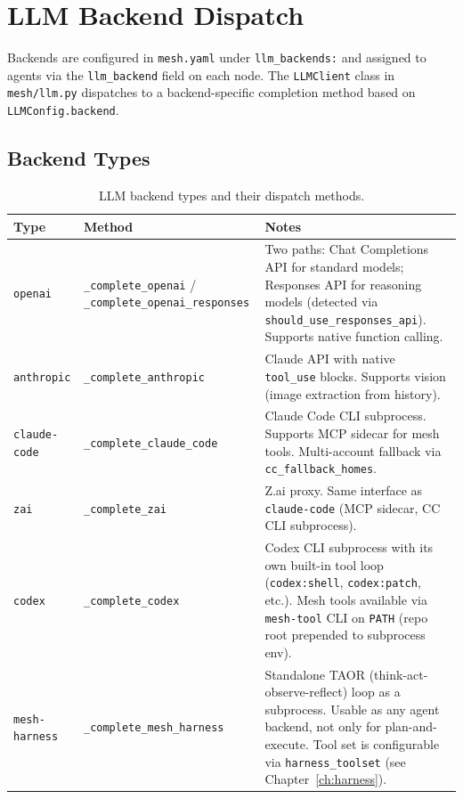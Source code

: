 \documentclass[11pt,letterpaper]{report}
\newcommand{\code}[1]{\texttt{#1}}
\begin{document}
\chapter{LLM Backend Dispatch}
\label{ch:backends}

Backends are configured in \code{mesh.yaml} under \code{llm\_backends:}
and assigned to agents via the \code{llm\_backend} field on each node.
The \code{LLMClient} class in \code{mesh/llm.py} dispatches to a
backend-specific completion method based on \code{LLMConfig.backend}.

\section{Backend Types}

\begin{table}[h]
\centering
\small
\begin{tabular}{@{}llL{6.5cm}@{}}
\toprule
\textbf{Type} & \textbf{Method} & \textbf{Notes} \\
\midrule
\code{openai}
  & \code{\_complete\_openai} /
    \code{\_complete\_openai\_responses}
  & Two paths: Chat Completions API for standard models;
    Responses API for reasoning models (detected via
    \code{should\_use\_responses\_api}). Supports native
    function calling. \\
\addlinespace
\code{anthropic}
  & \code{\_complete\_anthropic}
  & Claude API with native \code{tool\_use} blocks. Supports
    vision (image extraction from history). \\
\addlinespace
\code{claude-code}
  & \code{\_complete\_claude\_code}
  & Claude Code CLI subprocess. Supports MCP sidecar for
    mesh tools. Multi-account fallback via
    \code{cc\_fallback\_homes}. \\
\addlinespace
\code{zai}
  & \code{\_complete\_zai}
  & Z.ai proxy. Same interface as \code{claude-code}
    (MCP sidecar, CC CLI subprocess). \\
\addlinespace
\code{codex}
  & \code{\_complete\_codex}
  & Codex CLI subprocess with its own built-in tool loop
    (\code{codex:shell}, \code{codex:patch}, etc.).
    Mesh tools available via \code{mesh-tool} CLI on
    \code{PATH} (repo root prepended to subprocess env). \\
\addlinespace
\code{mesh-harness}
  & \code{\_complete\_mesh\_harness}
  & Standalone TAOR (think-act-observe-reflect) loop
    as a subprocess. Usable as any agent backend, not
    only for plan-and-execute. Tool set is configurable
    via \code{harness\_toolset} (see
    Chapter~\ref{ch:harness}). \\
\bottomrule
\end{tabular}
\caption{LLM backend types and their dispatch methods.}
\label{tab:backends}
\end{table}
\end{document}
